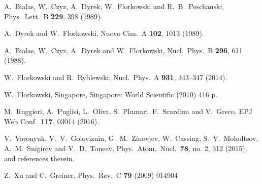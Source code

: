 \documentclass[aps,prc,a4paper,nofootinbib,
preprintnumbers,superscriptaddress,twocolumn,showpacs,showkeys]{revtex4}
\begin{document}
\begin{thebibliography}{99}
  A.~Bialas, W.~Czyz, A.~Dyrek, W.~Florkowski and R.~B.~Peschanski,
  Phys.\ Lett.\ B {\bf 229}, 398 (1989).
  
  A.~Dyrek and W.~Florkowski,
  Nuovo Cim.\ A {\bf 102}, 1013 (1989).
  
  A.~Bialas, W.~Czyz, A.~Dyrek and W.~Florkowski,
  Nucl.\ Phys.\ B {\bf 296}, 611 (1988).
  
 

  
  W.~Florkowski and R.~Ryblewski,
  Nucl.\ Phys.\ A {\bf 931}, 343–347 (2014).


  W.~Florkowski,
  Singapore, Singapore: World Scientific (2010) 416 p.
  


  
  M.~Ruggieri, A.~Puglisi, L.~Oliva, S.~Plumari, F.~Scardina and V.~Greco,
  EPJ Web Conf.\  {\bf 117}, 03014 (2016).
  
  
  V.~Voronyuk, V.~V.~Goloviznin, G.~M.~Zinovjev, W.~Cassing, S.~V.~Molodtsov, A.~M.~Snigirev and V.~D.~Toneev,
  Phys.\ Atom.\ Nucl.\  {\bf 78}, no. 2, 312 (2015),
  and references therein.
  
  Z.~Xu and C.~Greiner,
  Phys.\ Rev.\ C {\bf 79} (2009) 014904
  

\end{thebibliography}
\end{document}
